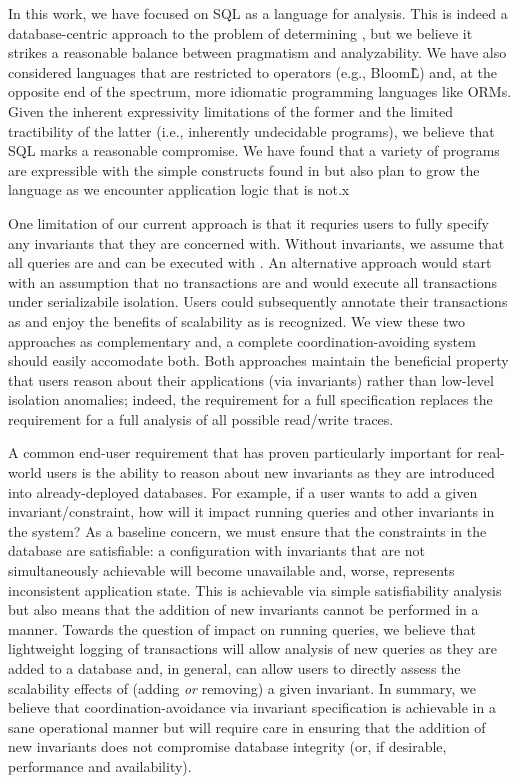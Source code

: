  In this work, we have
focused on SQL as a language for analysis. This is indeed a
database-centric approach to the problem of determining \iconfluence,
but we believe it strikes a reasonable balance between pragmatism and
analyzability. We have also considered languages that are restricted
to \iconfluent operators (e.g., Bloom\^L) and, at the opposite end of
the spectrum, more idiomatic programming languages like ORMs. Given
the inherent expressivity limitations of the former and the limited
tractibility of the latter (i.e., inherently undecidable programs), we
believe that SQL marks a reasonable compromise. We have found that a
variety of programs are expressible with the simple constructs found
in \lang but also plan to grow the language as we encounter
application logic that is not.x

 One limitation of our current
approach is that it requries users to fully specify any invariants
that they are concerned with. Without invariants, we assume that all
queries are \iconfluent and can be executed with \cfreedom. An
alternative approach would start with an assumption that no
transactions are \iconfluent and would execute all transactions under
serializabile isolation. Users could subsequently annotate their
transactions as \iconfluent and enjoy the benefits of scalability as
\cfreedom is recognized. We view these two approaches as complementary
and, a complete coordination-avoiding system should easily accomodate
both. Both approaches maintain the beneficial property that users
reason about their applications (via invariants) rather than low-level
isolation anomalies; indeed, the requirement for a full specification
replaces the requirement for a full analysis of all possible
read/write traces.

 A common end-user requirement that has
proven particularly important for real-world users is the ability to
reason about new invariants as they are introduced into
already-deployed databases. For example, if a user wants to add a
given invariant/constraint, how will it impact running queries and
other invariants in the system? As a baseline concern, we must ensure
that the constraints in the database are satisfiable: a configuration
with invariants that are not simultaneously achievable will become
unavailable and, worse, represents inconsistent application
state. This is achievable via simple satisfiability analysis but also
means that the addition of new invariants cannot be performed in a
\cfree manner. Towards the question of impact on running queries, we
believe that lightweight logging of transactions will allow analysis
of new queries as they are added to a database and, in general, can
allow users to directly assess the scalability effects of (adding
\textit{or} removing) a given invariant. In summary, we believe that
coordination-avoidance via invariant specification is achievable in a
sane operational manner but will require care in ensuring that the
addition of new invariants does not compromise database integrity (or,
if desirable, performance and availability).
